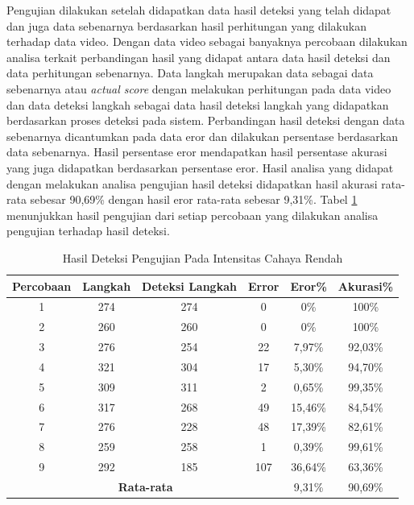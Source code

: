 Pengujian dilakukan setelah didapatkan data hasil deteksi yang telah didapat dan juga data sebenarnya berdasarkan hasil perhitungan yang dilakukan terhadap data video. Dengan data video sebagai banyaknya percobaan dilakukan analisa terkait perbandingan hasil yang didapat antara data hasil deteksi dan data perhitungan sebenarnya. Data langkah merupakan data sebagai data sebenarnya atau \emph{actual score} dengan melakukan perhitungan pada data video dan data deteksi langkah sebagai data hasil deteksi langkah yang didapatkan berdasarkan proses deteksi pada sistem. Perbandingan hasil deteksi dengan data sebenarnya dicantumkan pada data eror dan dilakukan persentase berdasarkan data sebenarnya. Hasil persentase eror mendapatkan hasil persentase akurasi yang juga didapatkan berdasarkan persentase eror. Hasil analisa yang didapat dengan melakukan analisa pengujian hasil deteksi didapatkan hasil akurasi rata-rata sebesar 90,69\% dengan hasil eror rata-rata sebesar 9,31\%. Tabel \ref{tb:PengujianIntensitasRendahAnalisaDeteksi} menunjukkan hasil pengujian dari setiap percobaan yang dilakukan analisa pengujian terhadap hasil deteksi.

\begin{longtable}{|c|c|c|c|c|c|}
  \caption{Hasil Deteksi Pengujian Pada Intensitas Cahaya Rendah}
  \label{tb:PengujianIntensitasRendahAnalisaDeteksi}                                   \\
  \hline
  \rowcolor[HTML]{C0C0C0}
  \textbf{Percobaan} & \textbf{Langkah} & \textbf{Deteksi Langkah} & \textbf{Error} & \textbf{Eror\%} & \textbf{Akurasi\%} \\
  \hline
  1   & 274   & 274 & 0    & 0\%       & 100\%   \\
  \hline
  2   & 260   & 260 & 0    & 0\%       & 100\%   \\
  \hline
  3   & 276   & 254 & 22   & 7,97\%    & 92,03\%     \\
  \hline
  4   & 321   & 304 & 17   & 5,30\%    & 94,70\%   \\
  \hline
  5   & 309   & 311 & 2    & 0,65\%    & 99,35\%   \\
  \hline
  6   & 317   & 268 & 49   & 15,46\%   & 84,54\%   \\
  \hline
  7   & 276   & 228 & 48   & 17,39\%   & 82,61\%   \\
  \hline
  8   & 259   & 258 & 1    & 0,39\%    & 99,61\%   \\
  \hline
  9   & 292   & 185 & 107  & 36,64\%   & 63,36\%   \\
  \hline

  \multicolumn{4}{|c|}{\textbf{Rata-rata}} & 9,31\% & 90,69\% \\
  \hline
\end{longtable}

